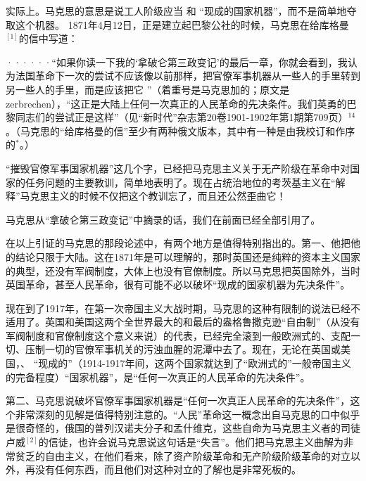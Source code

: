 实际上。马克思的意思是说工人阶级应当 和 “现成的国家机器”，而不是简单地夺取这个机器。
1871年4月12日，正是建立起巴黎公社的时候，马克思在给库格曼$^{[1]}$的信中写道：

\pskip 
\leftskip=10mm
\small

······“如果你读一下我的‘拿破仑第三政变记’的最后一章，你就会看到，我认为法国革命下一次的尝试不应该像以前那样，把官僚军事机器从一些人的手里转到另一些人的手里，而是应该把它 ”（着重号是马克思加的；原文是zerbrechen），“这正是大陆上任何一次真正的人民革命的先决条件。我们英勇的巴黎同志们的尝试正是这样”（见“新时代”杂志第20卷1901-1902年第1期第709页）$^{14}$。（马克思的“给库格曼的信”至少有两种俄文版本，其中有一种是由我校订和作序的$^{*}$。）

\leftskip=0mm
\normalsize
\pskip 

“摧毁官僚军事国家机器”这几个字，已经把马克思主义关于无产阶级在革命中对国家的任务问题的主要教训，简单地表明了。现在占统治地位的考茨基主义在“解释”马克思主义的时候不仅把这个教训忘了，而且还公然歪曲它！

马克思从“拿破仑第三政变记”中摘录的话，我们在前面已经全部引用了。

在以上引证的马克思的那段论述中，有两个地方是值得特别指出的。第一、他把他的结论只限于大陆。这在1871年是可以理解的，那时英国还是纯粹的资本主义国家的典型，还没有军阀制度，大体上也没有官僚制度。所以马克思把英国除外，当时英国革命，甚至人民革命，很有可能{\kaishu 不必}以破坏“现成的国家机器为先决条件”。

现在到了1917年，在第一次帝国主义大战时期，马克思的这种有限制的说法已经不适用了。英国和美国这两个全世界最大的和最后的盎格鲁撒克逊“自由制”（从没有军阀制度和官僚制度这个意义来说）的代表，已经完全滚到一般欧洲式的、支配一切、压制一切的官僚军事机关的污浊血腥的泥潭中去了。现在，无论在英国或美国，、 “现成的”（1914-1917年间，这两个国家就达到了“欧洲式的”一般帝国主义的完备程度）“国家机器”，是“任何一次真正的人民革命的先决条件”。

第二、马克思说破坏官僚军事国家机器是“任何一次真正人民革命的先决条件”，这个非常深刻的见解是值得特别注意的。“人民”革命这一概念出自马克思的口中似乎是很奇怪的，俄国的普列汉诺夫分子和孟什维克，这些自命为马克思主义者的司徒卢威$^{[2]}$的信徒，也许会说马克思说这句话是“失言”。他们把马克思主义曲解为非常贫乏的自由主义，在他们看来，除了资产阶级革命和无产阶级阶级革命的对立以外，再没有任何东西，而且他们对这种对立的了解也是非常死板的。

